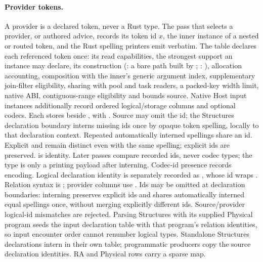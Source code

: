\paragraph{Provider tokens.} A provider is a declared token, never a Rust type.
The pass that selects a provider, or authored  advice, records
its token id $x$, the inner instance of a nested or routed token, and the Rust
spelling printers emit verbatim. The  table declares each
referenced token once: its read capabilities, the strongest support an
instance may declare, its construction (: a bare path built by
; : ), allocation
accounting, composition with the inner's generic argument index, supplementary
join-filter eligibility, sharing with pool and task readers, a packed-key
width limit, native ABI, contiguous-range eligibility and bounds source.
Native Host input instances additionally record ordered logical/storage columns
and optional codecs. Each  stores
 beside , with
.
Source  may omit the id; the Structures declaration boundary
interns missing ids once by opaque token spelling, locally to that declaration
context. Repeated automatically interned spellings share an id.
Explicit  and  remain distinct even
with the same spelling; explicit ids are preserved.  is identity.
Later passes compare recorded ids, never codec types; the type is only a
printing payload after interning. Codec-id presence records encoding.
Logical declaration identity is separately recorded as
, whose id wraps
. Relation syntax is ;
provider columns use .
Ids may be omitted at declaration boundaries: interning preserves explicit
ids and shares automatically interned equal spellings once, without merging
explicitly different ids. Source/provider logical-id mismatches are rejected.
Parsing Structures with its supplied Physical program seeds the input declaration
table with that program's relation identities, so input encounter order cannot renumber
logical types. Standalone Structures declarations intern in their own table;
programmatic producers copy the source declaration identities.
RA and Physical rows carry a sparse  map.
